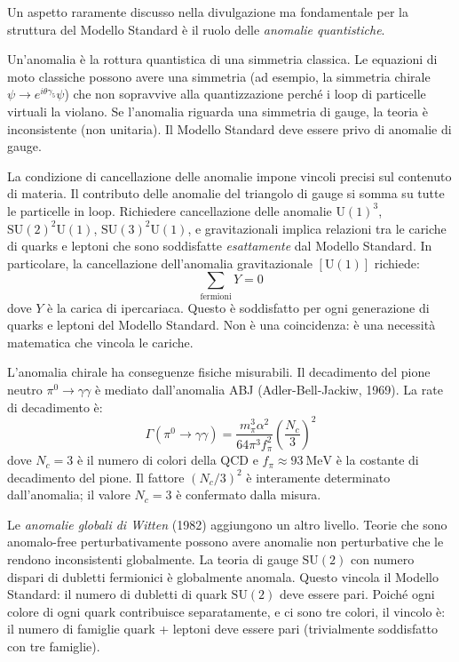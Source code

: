 \documentclass[11.5pt,a4paper,openany]{book}
\theoremstyle{remark}
\begin{document}
Un aspetto raramente discusso nella divulgazione ma fondamentale per la struttura del Modello Standard è il ruolo delle \textit{anomalie quantistiche}.

Un'anomalia è la rottura quantistica di una simmetria classica. Le equazioni di moto classiche possono avere una simmetria (ad esempio, la simmetria chirale $\psi \to e^{i\theta\gamma_5}\psi$) che non sopravvive alla quantizzazione perché i loop di particelle virtuali la violano. Se l'anomalia riguarda una simmetria di gauge, la teoria è inconsistente (non unitaria). Il Modello Standard deve essere privo di anomalie di gauge.

La condizione di cancellazione delle anomalie impone vincoli precisi sul contenuto di materia. Il contributo delle anomalie del triangolo di gauge si somma su tutte le particelle in loop. Richiedere cancellazione delle anomalie $\mathrm{U}(1)^3$, $\mathrm{SU}(2)^2 \mathrm{U}(1)$, $\mathrm{SU}(3)^2 \mathrm{U}(1)$, e gravitazionali implica relazioni tra le cariche di quarks e leptoni che sono soddisfatte \textit{esattamente} dal Modello Standard. In particolare, la cancellazione dell'anomalia gravitazionale $[\mathrm{U}(1)]$ richiede:
\[
\sum_{\text{fermioni}} Y = 0
\]
dove $Y$ è la carica di ipercariaca. Questo è soddisfatto per ogni generazione di quarks e leptoni del Modello Standard. Non è una coincidenza: è una necessità matematica che vincola le cariche.

L'anomalia chirale ha conseguenze fisiche misurabili. Il decadimento del pione neutro $\pi^0 \to \gamma\gamma$ è mediato dall'anomalia ABJ (Adler-Bell-Jackiw, 1969). La rate di decadimento è:
\[
\Gamma(\pi^0 \to \gamma\gamma) = \frac{m_\pi^3\alpha^2}{64\pi^3 f_\pi^2}\left(\frac{N_c}{3}\right)^2
\]
dove $N_c = 3$ è il numero di colori della QCD e $f_\pi \approx 93\ \text{MeV}$ è la costante di decadimento del pione. Il fattore $(N_c/3)^2$ è interamente determinato dall'anomalia; il valore $N_c = 3$ è confermato dalla misura.

Le \textit{anomalie globali di Witten} (1982) aggiungono un altro livello. Teorie che sono anomalo-free perturbativamente possono avere anomalie non perturbative che le rendono inconsistenti globalmente. La teoria di gauge $\mathrm{SU}(2)$ con numero dispari di dubletti fermionici è globalmente anomala. Questo vincola il Modello Standard: il numero di dubletti di quark $\mathrm{SU}(2)$ deve essere pari. Poiché ogni colore di ogni quark contribuisce separatamente, e ci sono tre colori, il vincolo è: il numero di famiglie quark + leptoni deve essere pari (trivialmente soddisfatto con tre famiglie).
\end{document}
